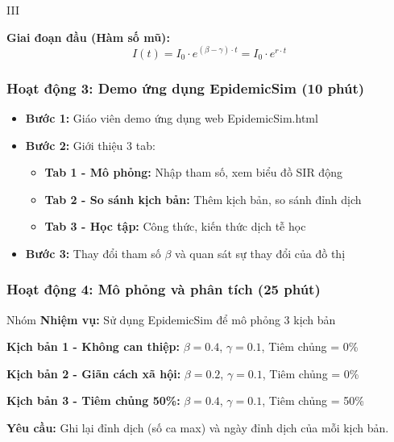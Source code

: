 \documentclass[12pt,a4paper]{article}
\begin{document}
\begin{competitionsection}{III}
\begin{keyformula}
\textbf{Giai đoạn đầu (Hàm số mũ):}
$$I(t) = I_0 \cdot e^{(\beta - \gamma) \cdot t} = I_0 \cdot e^{r \cdot t}$$
\end{keyformula}

\subsubsection*{Hoạt động 3: Demo ứng dụng EpidemicSim (10 phút)}
\begin{itemize}[leftmargin=*,noitemsep]
\item \textbf{Bước 1:} Giáo viên demo ứng dụng web EpidemicSim.html
\item \textbf{Bước 2:} Giới thiệu 3 tab:
    \begin{itemize}
    \item \textbf{Tab 1 - Mô phỏng:} Nhập tham số, xem biểu đồ SIR động
    \item \textbf{Tab 2 - So sánh kịch bản:} Thêm kịch bản, so sánh đỉnh dịch
    \item \textbf{Tab 3 - Học tập:} Công thức, kiến thức dịch tễ học
    \end{itemize}
\item \textbf{Bước 3:} Thay đổi tham số $\beta$ và quan sát sự thay đổi của đồ thị
\end{itemize}

\subsubsection*{Hoạt động 4: Mô phỏng và phân tích (25 phút)}
\begin{task}{Nhóm}
\textbf{Nhiệm vụ:} Sử dụng EpidemicSim để mô phỏng 3 kịch bản

\textbf{Kịch bản 1 - Không can thiệp:} $\beta = 0.4$, $\gamma = 0.1$, Tiêm chủng = 0\%

\textbf{Kịch bản 2 - Giãn cách xã hội:} $\beta = 0.2$, $\gamma = 0.1$, Tiêm chủng = 0\%

\textbf{Kịch bản 3 - Tiêm chủng 50\%:} $\beta = 0.4$, $\gamma = 0.1$, Tiêm chủng = 50\%

\textbf{Yêu cầu:} Ghi lại đỉnh dịch (số ca max) và ngày đỉnh dịch của mỗi kịch bản.
\end{task}


\end{competitionsection}
\end{document}
